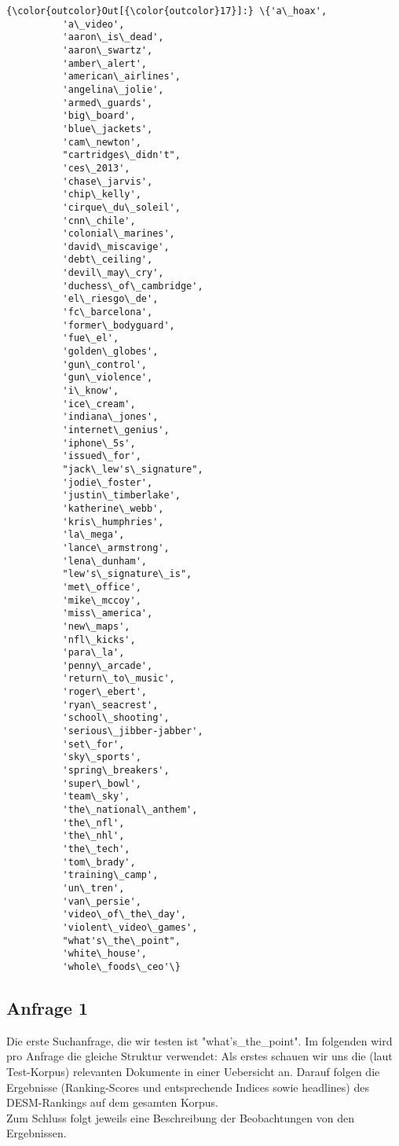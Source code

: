 \documentclass[11pt]{article}
\begin{document}
\begin{Verbatim}[commandchars=\\\{\}]
{\color{outcolor}Out[{\color{outcolor}17}]:} \{'a\_hoax',
          'a\_video',
          'aaron\_is\_dead',
          'aaron\_swartz',
          'amber\_alert',
          'american\_airlines',
          'angelina\_jolie',
          'armed\_guards',
          'big\_board',
          'blue\_jackets',
          'cam\_newton',
          "cartridges\_didn't",
          'ces\_2013',
          'chase\_jarvis',
          'chip\_kelly',
          'cirque\_du\_soleil',
          'cnn\_chile',
          'colonial\_marines',
          'david\_miscavige',
          'debt\_ceiling',
          'devil\_may\_cry',
          'duchess\_of\_cambridge',
          'el\_riesgo\_de',
          'fc\_barcelona',
          'former\_bodyguard',
          'fue\_el',
          'golden\_globes',
          'gun\_control',
          'gun\_violence',
          'i\_know',
          'ice\_cream',
          'indiana\_jones',
          'internet\_genius',
          'iphone\_5s',
          'issued\_for',
          "jack\_lew's\_signature",
          'jodie\_foster',
          'justin\_timberlake',
          'katherine\_webb',
          'kris\_humphries',
          'la\_mega',
          'lance\_armstrong',
          'lena\_dunham',
          "lew's\_signature\_is",
          'met\_office',
          'mike\_mccoy',
          'miss\_america',
          'new\_maps',
          'nfl\_kicks',
          'para\_la',
          'penny\_arcade',
          'return\_to\_music',
          'roger\_ebert',
          'ryan\_seacrest',
          'school\_shooting',
          'serious\_jibber-jabber',
          'set\_for',
          'sky\_sports',
          'spring\_breakers',
          'super\_bowl',
          'team\_sky',
          'the\_national\_anthem',
          'the\_nfl',
          'the\_nhl',
          'the\_tech',
          'tom\_brady',
          'training\_camp',
          'un\_tren',
          'van\_persie',
          'video\_of\_the\_day',
          'violent\_video\_games',
          "what's\_the\_point",
          'white\_house',
          'whole\_foods\_ceo'\}
\end{Verbatim}
            
    \subsection{Anfrage 1}\label{anfrage-1}

    Die erste Suchanfrage, die wir testen ist "what's\_the\_point". Im
folgenden wird pro Anfrage die gleiche Struktur verwendet: Als erstes
schauen wir uns die (laut Test-Korpus) relevanten Dokumente in einer
Uebersicht an. Darauf folgen die Ergebnisse (Ranking-Scores und
entsprechende Indices sowie headlines) des DESM-Rankings auf dem
gesamten Korpus.\\
Zum Schluss folgt jeweils eine Beschreibung der Beobachtungen von den
Ergebnissen.
\end{document}
